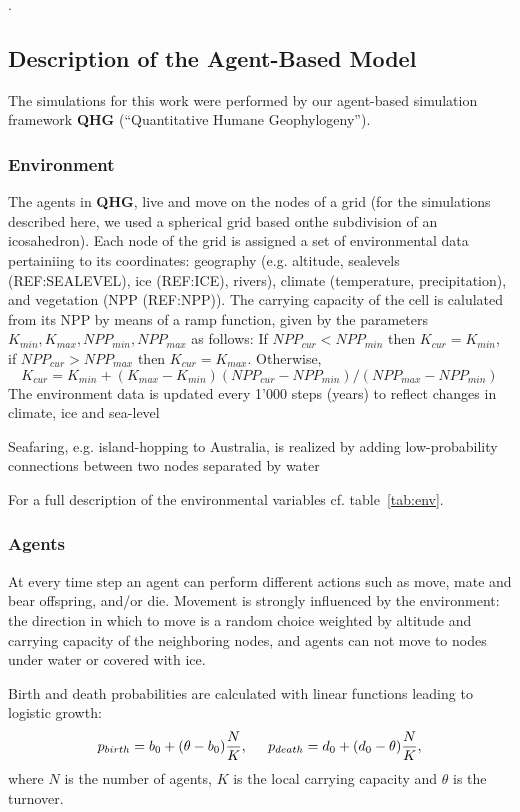 \documentclass[a4paper,oneside]{article}
\begin{document}
.

\subsection*{Description of the Agent-Based Model}
The simulations for this work were performed by our agent-based 
simulation framework {\bf QHG} (``Quantitative Humane Geophylogeny'').
\subsubsection*{Environment}
The agents in {\bf QHG}, live and move on the nodes of a grid (for the simulations described here, 
we used a spherical grid based onthe subdivision of an icosahedron).
Each node of the grid is assigned a set of environmental data pertainiing to its coordinates:
geography (e.g. altitude, sealevels (REF:SEALEVEL), ice (REF:ICE), rivers), climate (temperature, precipitation),
and vegetation (NPP (REF:NPP)).
The carrying capacity of the cell is calulated from its NPP by means of a ramp function, given by the
parameters $K_{min}, K_{max}, NPP_{min}, NPP_{max}$  as follows:
If $NPP_{cur} < NPP_{min}$ then $K_{cur} =  K_{min}$, 
if $NPP_{cur} > NPP_{max}$ then $K_{cur} =  K_{max}$. Otherwise,
\[ K_{cur} = K_{min} + (K_{max}-K_{min})(NPP_{cur} - NPP_{min})/(NPP_{max} - NPP_{min})\]
The environment data is updated every 1'000 steps (years) to reflect changes in climate, ice and sea-level

Seafaring, e.g. island-hopping to Australia, is realized by adding low-probability connections between two 
nodes separated by water

For a full description of the environmental variables cf. table~\ref{tab:env}.

\subsubsection*{Agents}
At every time step an agent can perform different actions such as move, mate and bear offspring, and/or die. 
Movement is strongly influenced by the environment: the direction in which to move is a random choice 
weighted by altitude and carrying capacity of the neighboring nodes, and agents can not move to nodes 
under water or covered with ice.

Birth and death probabilities are calculated with linear functions leading to logistic growth:
\[ 
  p_{birth}  =  b_{0} + (\theta - b_{0})\frac{N}{K},\hspace{0.2in}
  p_{death}  =  d_{0} + (d_{0} - \theta)\frac{N}{K}, 
\]
where $N$ is the number of agents, $K$ is the local carrying capacity and $\theta$ is the turnover.
\end{document}
